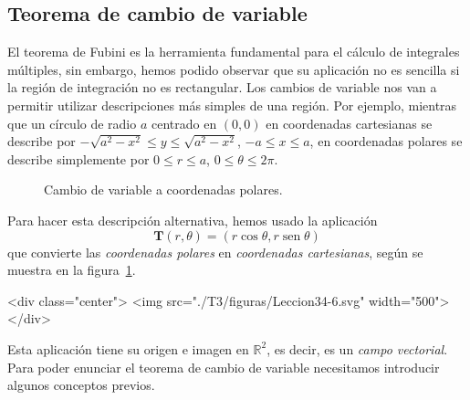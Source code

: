 \vspace{2em}

\subsection{Teorema de cambio de variable}

El teorema de Fubini es la herramienta fundamental para el cálculo de integrales múltiples, sin embargo, hemos podido observar que su aplicación no es sencilla si la región de integración no es rectangular.
Los cambios de variable nos van a permitir utilizar descripciones más simples de una región. Por ejemplo, mientras que un círculo de radio $a$ centrado en $(0,0)$ en coordenadas cartesianas se describe por $-\sqrt{a^2-x^2}\le y\le \sqrt{a^2-x^2}$, $-a\le x\le a$, en coordenadas polares se describe simplemente por $0\le r\le a$, $0\le \theta\le 2\pi$.
%
\begin{latexonly}
\begin{figure}
\begin{center}
\end{center}
\caption{Cambio de variable a coordenadas polares.}\label{fig:pol}
\end{figure}
\end{latexonly}
%
Para hacer esta descripción alternativa, hemos usado la aplicación
\[
\boldsymbol{T}(r,\theta) = (r\cos\theta,r\operatorname{sen}\theta)
\]
que convierte las \emph{coordenadas polares} en \emph{coordenadas cartesianas}, según se muestra
en la figura~\ref{fig:pol}.
\begin{rawhtml}
<div class="center">
<img src="./T3/figuras/Leccion34-6.svg" width="500">
</div>
\end{rawhtml}
Esta aplicación tiene su origen e imagen en $\mathbb{R}^2$, es decir, es un \emph{campo vectorial}.
Para poder enunciar el teorema de cambio de variable necesitamos introducir algunos conceptos previos.

